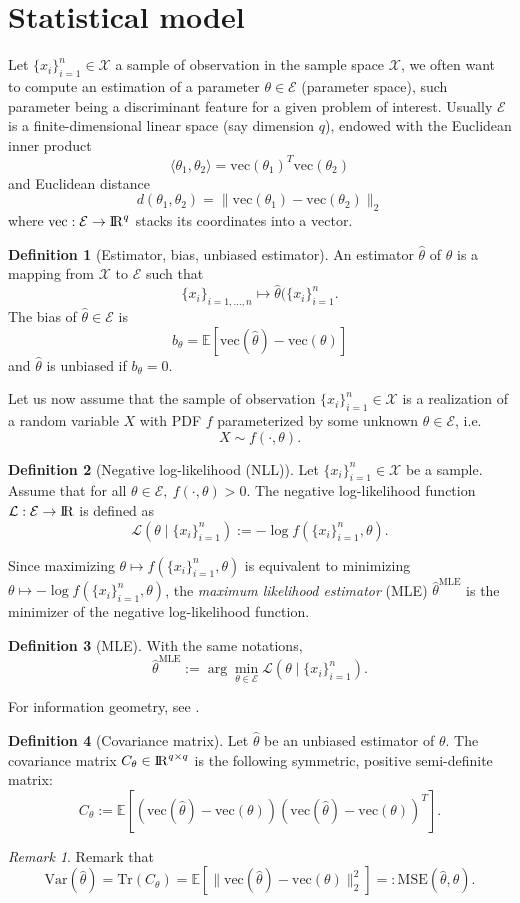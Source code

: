 \documentclass[10pt,a4paper]{book}
\theoremstyle{definition}
\newtheorem{defn}{Definition}[section]
\theoremstyle{plain}
\theoremstyle{remark}
\newtheorem{rmk}{Remark}[section]
\newcommand{\E}{\mathcal{E}}
\newcommand{\vecto}{\text{vec}}
\newcommand \Esp {\mathbb{E}}
\def\R{{\rm I\kern-0.16em R}}
\begin{document}
\section{Statistical model}
Let $\{x_i\}_{i=1}^{n} \in \mathcal{X}$ a sample of observation in the sample space $\mathcal{X}$, we often want to compute an estimation of a  parameter $\theta \in \E$ (parameter space), such parameter being a discriminant feature for a given problem of interest. Usually $\E$ is a finite-dimensional linear space (say dimension $q$), endowed with the Euclidean inner product
$$\langle \theta_1,\theta_2\rangle=\vecto(\theta_1)^T \vecto(\theta_2)$$
and Euclidean distance
$$d(\theta_1,\theta_2)=\|\vecto(\theta_1)-\vecto(\theta_2)\|_2$$
where $\vecto:\E\to\R^{q}$ stacks its coordinates into a vector.
\begin{defn}[Estimator, bias, unbiased estimator]
An estimator $\hat{\theta}$ of $\theta$ is a mapping from $\mathcal{X}$ to $\E$ such that
$$\{x_i\}_{i=1,\dots, n} \mapsto \hat{\theta}(\{x_i\}_{i=1}^{n}.$$
The bias of $\hat{\theta}\in \E$ is
$$b_{\theta}=\Esp\left[\vecto(\hat{\theta})-\vecto(\theta)\right]$$ and $\hat{\theta}$ is unbiased if $b_{\theta}= 0$. 
\end{defn}

Let us now assume that the sample of observation $\{x_i\}_{i=1}^{n} \in \mathcal{X}$ is a realization of a random variable $X$ with PDF $f$ parameterized by some unknown $\theta \in \E$, i.e.
$$X\sim f(\cdot,\theta).$$
\begin{defn}[Negative log-likelihood (NLL)]
Let $\{x_i\}_{i=1}^{n} \in \mathcal{X}$ be a sample. Assume that for all $\theta \in \E,~f(\cdot,\theta)>0$. The negative log-likelihood function $\mathcal{L}:\E\to \R$ is defined as
$$\mathcal{L}(\theta \mid \{x_i\}_{i=1}^{n}):=-\log f(\{x_i\}_{i=1}^{n},\theta).$$
\end{defn}
Since maximizing $\theta \mapsto f(\{x_i\}_{i=1}^{n}, \theta)$ is equivalent to minimizing $\theta \mapsto -\log  f(\{x_i\}_{i=1}^{n},\theta)$, the \emph{maximum likelihood estimator} (MLE) $\hat{\theta}^{\text{MLE}}$ is the minimizer of the negative log-likelihood function.
\begin{defn}[MLE]
With the same notations, 
$$\hat{\theta}^{\text{MLE}}:=\arg \min_{\theta \in \E} \mathcal{L}(\theta \mid \{x_i\}_{i=1}^{n}).$$
\end{defn}

For information geometry, see \cite{amari2016information}. 

\begin{defn}[Covariance matrix]
Let $\hat{\theta}$ be an unbiased estimator of $\theta$. The covariance matrix $C_{\theta}\in \R^{q\times q}$ is the following symmetric, positive semi-definite matrix:
$$C_{\theta}:=\Esp\left[(\vecto(\hat{\theta})-\vecto(\theta))(\vecto(\hat{\theta})-\vecto(\theta))^T\right].$$
\end{defn}
\begin{rmk}
Remark that
$$\text{Var}(\hat{\theta})=\text{Tr}(C_{\theta})=\Esp\left[ \|\vecto(\hat{\theta})-\vecto(\theta)\|_2^2\right]=:\text{MSE}(\hat{\theta},\theta).$$
\end{rmk}
\end{document}
